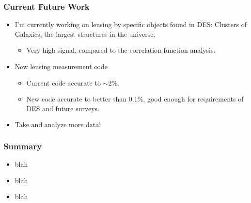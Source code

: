 \documentclass{beamer}
\begin{document}
\frame
{

    \frametitle{Current Future Work}
 
 
    \begin{itemize}


        \item I'm currently working on lensing by specific objects found in
            DES: Clusters of Galaxies, the largest structures in the universe.

        \begin{itemize}
            \item Very high signal, compared to the correlation function analysis.
        \end{itemize}

        \item New lensing measurement code
        \begin{itemize}
            \item Current code accurate to $\sim 2$\%.
            \item New code accurate to better than 0.1\%, good enough for
                requirements of DES and future surveys.
        \end{itemize}

        \item Take and analyze more data!

    \end{itemize}

}




\frame
{

    \frametitle{Summary}
 
 
    \begin{itemize}

        \item blah

        \item blah

        \item blah

    \end{itemize}

}
\end{document}

